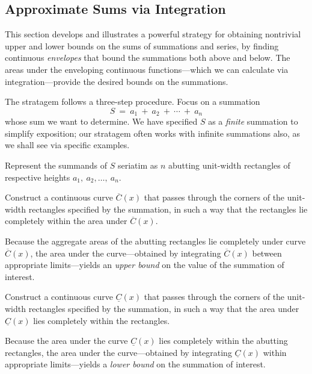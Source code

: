 \subsection{Approximate Sums via Integration}
\label{sec:riemann-bounds}

This section develops and illustrates a powerful strategy for obtaining nontrivial upper and lower bounds on the sums of summations and series, by finding continuous {\em envelopes} that bound the summations both above and below.  The areas under the enveloping continuous functions---which we can calculate via integration---provide the desired bounds on the summations.

\medskip

The stratagem follows a three-step procedure.  Focus on a summation
\[ S \ = \ a_1 \ + \ a_2 \ + \ \cdots \ + \ a_n \]
whose sum we want to determine.  We have specified $S$ as a {\em finite} summation to simplify exposition; our stratagem often works with infinite summations also, as we shall see via specific examples.

\medskip

Represent the summands of $S$ seriatim as $n$ abutting unit-width rectangles of respective heights $a_1, \ a_2, \ldots, \ a_n$.  


\medskip

Construct a continuous curve $\overline{C}(x)$ that passes through the corners of the unit-width rectangles specified by the summation, in such a way that the rectangles lie completely within the area under $\overline{C}(x)$.

\medskip

\noindent
Because the aggregate areas of the abutting rectangles lie completely under curve $\overline{C}(x)$, the area under the curve---obtained by integrating $\overline{C}(x)$ between appropriate limits---yields an {\em upper bound} on the value of the summation of interest.

\medskip

Construct a continuous curve $\underline{C}(x)$ that passes through the corners of the unit-width rectangles specified by the summation, in such a way that the area under $\underline{C}(x)$ lies completely within the rectangles.

\medskip

\noindent
Because the area under the curve $\underline{C}(x)$ lies completely within the abutting rectangles, the area under the curve---obtained by integrating $\underline{C}(x)$ within appropriate limits---yields a {\em lower bound} on the summation of interest.

